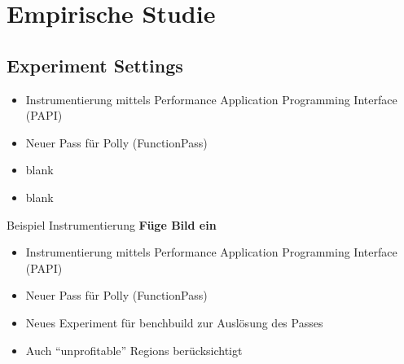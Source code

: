 \documentclass[aspectratio=169, xcolor=dvipsnames]{beamer}
\newcommand{\noitem}{\item[{\color{white} blank}] {\color{white} blank}}
\newcommand{\draftnote}[1]{{\color{red} \textbf{#1}}}
\begin{document}
\section{Empirische Studie}
\subsection{Experiment Settings}
\begin{frame}{\subsecname}
    \begin{itemize}
        \item Instrumentierung mittels Performance Application Programming Interface (PAPI)
        \item Neuer Pass für Polly (FunctionPass)
        \noitem
        \noitem
    \end{itemize}
\end{frame}
\begin{frame}{Beispiel Instrumentierung}
    \draftnote{Füge Bild ein}
\end{frame}
\begin{frame}{\subsecname}
    \begin{itemize}
        \item Instrumentierung mittels Performance Application Programming Interface (PAPI)
        \item Neuer Pass für Polly (FunctionPass)
        \item Neues Experiment für benchbuild zur Auslösung des Passes
        \item Auch \enquote{unprofitable} Regions berücksichtigt
    \end{itemize}
\end{frame}
\end{document}

